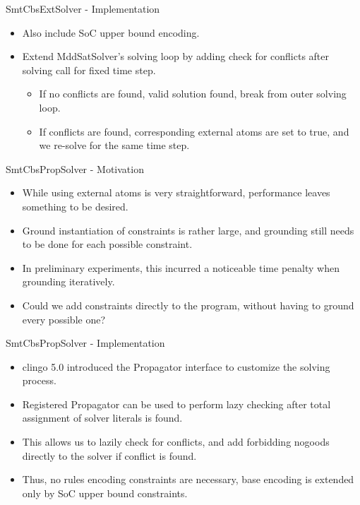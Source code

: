 \documentclass[aspectratio=169,xcolor=svgnames]{beamer}
\theoremstyle{theoremstyle_space}
\begin{document}
\begin{frame}[fragile=singleslide]{SmtCbsExtSolver - Implementation}
\begin{itemize}
    \item Also include SoC upper bound encoding.
    \item Extend MddSatSolver's solving loop by adding check for conflicts after solving call for fixed time step.
    \begin{itemize}
        \item If no conflicts are found, valid solution found, break from outer solving loop.
        \item If conflicts are found, corresponding external atoms are set to true, and we re-solve for the same time step.
    \end{itemize}

\end{itemize}
\end{frame}

\begin{frame}[fragile=singleslide]{SmtCbsPropSolver - Motivation}
\begin{itemize}
    \item While using external atoms is very straightforward, performance leaves something to be desired.
    \item Ground instantiation of constraints is rather large, and grounding still needs to be done for each possible constraint.
    \item In preliminary experiments, this incurred a noticeable time penalty when grounding iteratively.
    \item Could we add constraints directly to the program, without having to ground every possible one?

\end{itemize}
\end{frame}

\begin{frame}[fragile=singleslide]{SmtCbsPropSolver - Implementation}
\begin{itemize}
    \item clingo 5.0 introduced the Propagator interface to customize the solving process.
    \item Registered Propagator can be used to perform lazy checking after  total assignment of solver literals is found.
    \item This allows us to lazily check for conflicts, and add forbidding nogoods directly to the solver if conflict is found.
    \item Thus, no rules encoding constraints are necessary, base encoding is extended only by SoC upper bound constraints.
\end{itemize}
\end{frame}
\end{document}
